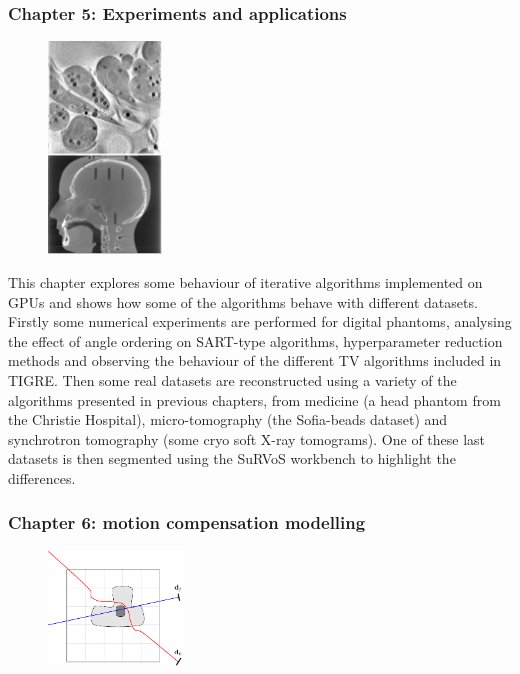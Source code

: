 \subsubsection{Chapter 5: Experiments and applications}

\begin{figure}
\centering
\includegraphics[width=0.27\textwidth]{Applications/thumnail.png}
\end{figure}

This chapter explores some behaviour of iterative algorithms implemented on GPUs and shows how some of the algorithms behave with different datasets. Firstly some numerical experiments are performed for digital phantoms, analysing the effect of angle ordering on SART-type algorithms, hyperparameter reduction methods and observing the behaviour of the different TV algorithms included in TIGRE. Then some real datasets are reconstructed using a variety of the algorithms presented in previous chapters, from medicine (a head phantom from the Christie Hospital), micro-tomography (the Sofia-beads dataset) and synchrotron tomography (some cryo soft X-ray tomograms). One of these last datasets is then segmented using the {SuRVoS} workbench to highlight the differences.


\FloatBarrier
\subsubsection{Chapter 6: motion compensation modelling}

\begin{figure}
\centering
\includegraphics[width=0.32\textwidth]{MotionCorrection/diagrammotion1.pdf}
\end{figure}

